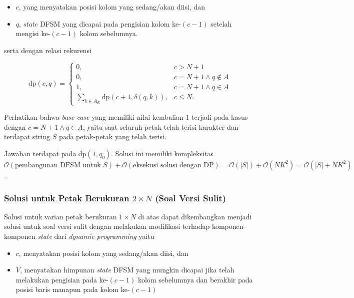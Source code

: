 \documentclass[../main_editorial.tex]{subfiles} %
\newcommand{\dpf}{\mathrm{dp}}
\newcommand{\bigO}[1]{\mathcal{O}(#1)}
\begin{document}
\begin{itemize}
\item $ c $, yang menyatakan posisi kolom yang sedang/akan diisi, dan
\item $ q $, \textit{state} DFSM yang dicapai pada pengisian kolom ke-$ (c-1) $ setelah mengisi ke-$ (c - 1) $ kolom sebelumnya.
\end{itemize}

serta dengan relasi rekurensi

$$
\dpf(c, q) = 
\begin{cases}
	0, & c > N + 1\\
	0, & c = N + 1\land q \not\in A\\
	1, & c = N + 1\land q \in A\\
	\displaystyle \sum_{k \in A_K} \dpf(c + 1, \delta(q, k)), & c \le N.
\end{cases}
$$

Perhatikan bahwa \textit{base case} yang memiliki nilai kembalian $ 1 $ terjadi pada kasus dengan $ c = N + 1 \land q \in A $, yaitu saat seluruh petak telah terisi karakter dan terdapat string $ S $ pada petak-petak yang telah terisi.

Jawaban terdapat pada $ \dpf(1, q_0) $. Solusi ini memiliki kompleksitas $ \bigO{\textrm{pembangunan DFSM untuk }S} + \bigO{\textrm{eksekusi solusi dengan DP}} = \bigO{|S|} + \bigO{NK^2} = \bigO{|S| + NK^2} $.

\subsubsection*{Solusi untuk Petak Berukuran $ 2 \times N $ (Soal Versi Sulit)}

Solusi untuk varian petak berukuran $ 1 \times N $ di atas dapat dikembangkan menjadi solusi untuk soal versi sulit dengan melakukan modifikasi terhadap komponen-komponen \textit{state} dari \textit{dynamic programming} yaitu

\begin{itemize}
\item $ c $, menyatakan posisi kolom yang sedang/akan diisi, dan
\item $ V $, menyatakan himpunan \textit{state} DFSM yang mungkin dicapai jika telah melakukan pengisian pada ke-$ (c - 1) $ kolom sebelumnya dan berakhir pada posisi baris manapun pada kolom ke-$ (c - 1) $
\end{itemize}
\end{document}
